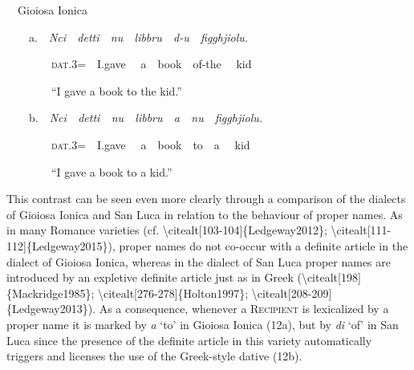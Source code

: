 \documentclass[output=paper,modfonts,nonflat]{langsci/langscibook}
\begin{document}
\setcounter{listWWNumviiileveli}{0}
\begin{listWWNumviiileveli}
\item 
\begin{styleListParagraph}
\ \ Gioiosa Ionica
\end{styleListParagraph}
\end{listWWNumviiileveli}
\begin{styleStandard}
\ \ \ \ a.\ \ \textit{Nci\ \ detti\ \ nu\ \ libbru\ \ d-u\ \ figghjiolu.}\ \ 
\end{styleStandard}

\begin{styleStandard}
\ \ \ \ \ \ \ \ \textsc{dat}.3=\ \ I.gave \ \ a\ \ book\ \ of-the \ \ kid\ \ 
\end{styleStandard}

\begin{styleStandard}
\ \ \ \ \ \ \ \ “I gave a book to the kid.”
\end{styleStandard}

\begin{styleStandard}
\ \ \ \ b.\ \ \textit{Nci\ \ detti\ \ nu\ \ libbru\ \ a\ \ nu\ \ figghjiolu.}\ \ 
\end{styleStandard}

\begin{styleStandard}
\ \ \ \ \ \ \ \ \textsc{dat}.3=\ \ I.gave \ \ a\ \ book\ \ to\ \ a \ \ kid\ \ 
\end{styleStandard}

\begin{styleStandard}
\ \ \ \ \ \ \ \ “I gave a book to a kid.”
\end{styleStandard}

\begin{styleStandard}
This contrast can be seen even more clearly through a comparison of the dialects of Gioiosa Ionica and San Luca in relation to the behaviour of proper names. As in many Romance varieties (cf. {\textbackslash}citealt[103-104]\{Ledgeway2012\}; {\textbackslash}citealt[111-112]\{Ledgeway2015\}), proper names do not co-occur with a definite article in the dialect of Gioiosa Ionica, whereas in the dialect of San Luca proper names are introduced by an expletive definite article just as in Greek ({\textbackslash}citealt[198]\{Mackridge1985\}; {\textbackslash}citealt[276-278]\{Holton1997\}; {\textbackslash}citealt[208-209]\{Ledgeway2013\}). As a consequence, whenever a \textsc{Recipient} is lexicalized by a proper name it is marked by \textit{a }‘to’ in Gioiosa Ionica (12a), but by \textit{di }‘of’ in San Luca since the presence of the definite article in this variety automatically triggers and licenses the use of the Greek-style dative (12b).
\end{styleStandard}
\end{document}

